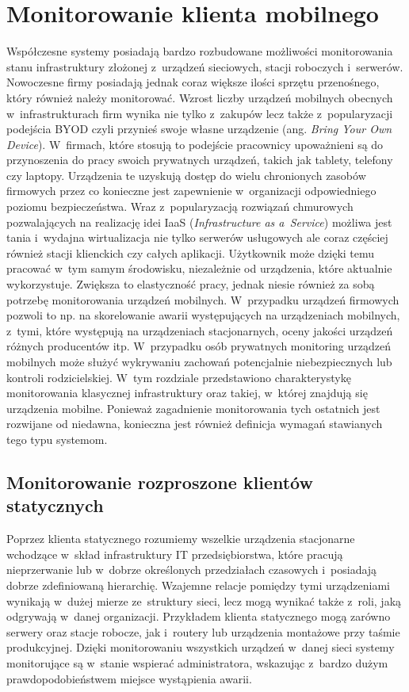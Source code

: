 \chapter{Monitorowanie klienta mobilnego}
\label{chap:Wymagania}

Współczesne systemy posiadają bardzo rozbudowane możliwości
monitorowania stanu infrastruktury złożonej z~urządzeń sieciowych,
stacji roboczych i~serwerów. Nowoczesne firmy posiadają jednak coraz
większe ilości sprzętu przenośnego, który również należy
monitorować. Wzrost liczby urządzeń mobilnych obecnych
w~infrastrukturach firm wynika nie tylko z~zakupów lecz także
z~popularyzacji podejścia BYOD czyli przynieś swoje własne urządzenie
(ang. {\em Bring Your Own Device}). W~firmach, które stosują to
podejście pracownicy upoważnieni są do przynoszenia do pracy swoich
prywatnych urządzeń, takich jak tablety, telefony czy
laptopy. Urządzenia te uzyskują dostęp do wielu chronionych zasobów
firmowych przez co konieczne jest zapewnienie w~organizacji
odpowiedniego poziomu bezpieczeństwa. Wraz z~popularyzacją rozwiązań
chmurowych pozwalających na realizację idei IaaS ({\em Infrastructure
  as a~Service}) możliwa jest tania i~wydajna wirtualizacja nie tylko
serwerów usługowych ale coraz częściej również stacji klienckich czy
całych aplikacji. Użytkownik może dzięki temu pracować w~tym samym
środowisku, niezależnie od urządzenia, które aktualnie
wykorzystuje. Zwiększa to elastyczność pracy, jednak niesie również za
sobą potrzebę monitorowania urządzeń mobilnych. W~przypadku urządzeń
firmowych pozwoli to np. na skorelowanie awarii występujących na
urządzeniach mobilnych, z~tymi, które występują na urządzeniach
stacjonarnych, oceny jakości urządzeń różnych producentów
itp. W~przypadku osób prywatnych monitoring urządzeń mobilnych może
służyć wykrywaniu zachowań potencjalnie niebezpiecznych lub kontroli
rodzicielskiej.  W~tym rozdziale przedstawiono charakterystykę
monitorowania klasycznej infrastruktury oraz takiej, w~której znajdują
się urządzenia mobilne. Ponieważ zagadnienie monitorowania tych
ostatnich jest rozwijane od niedawna, konieczna jest również definicja
wymagań stawianych tego typu systemom.

\section[Monitorowanie rozproszone][Monitorowanie rozproszone klientów
statycznych]{Monitorowanie rozproszone klientów statycznych}

Poprzez klienta statycznego rozumiemy wszelkie urządzenia stacjonarne
wchodzące w~skład infrastruktury IT przedsiębiorstwa, które pracują
nieprzerwanie lub w~dobrze określonych przedziałach czasowych
i~posiadają dobrze zdefiniowaną hierarchię. Wzajemne relacje pomiędzy
tymi urządzeniami wynikają w~dużej mierze ze~struktury sieci, lecz
mogą wynikać także z~roli, jaką odgrywają w~danej
organizacji. Przykładem klienta statycznego mogą zarówno serwery oraz
stacje robocze, jak i~routery lub urządzenia montażowe przy taśmie
produkcyjnej. Dzięki monitorowaniu wszystkich urządzeń w~danej sieci
systemy monitorujące są w~stanie wspierać administratora, wskazując
z~bardzo dużym prawdopodobieństwem miejsce wystąpienia awarii.

